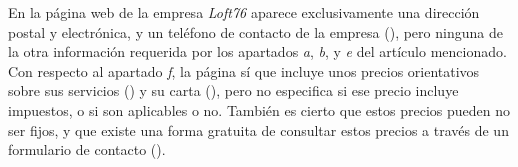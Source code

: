 En la página web de la empresa \textit{Loft76} \cite{loft76} aparece exclusivamente una dirección postal y electrónica, y un teléfono de contacto de la empresa (), pero ninguna de la otra información requerida por los apartados \textit{a}, \textit{b}, y \textit{e} del artículo mencionado. Con respecto al apartado \textit{f}, la página sí que incluye unos precios orientativos sobre sus servicios () y su carta (), pero no especifica si ese precio incluye impuestos, o si son aplicables o no. También es cierto que estos precios pueden no ser fijos, y que existe una forma gratuita de consultar estos precios a través de un formulario de contacto ().





